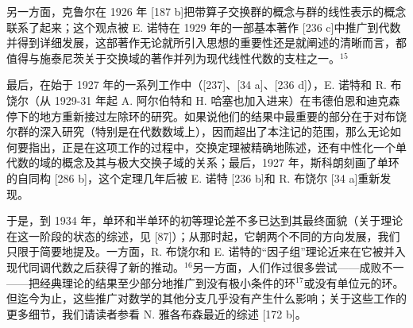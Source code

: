另一方面，克鲁尔在 1926 年 {[}187 b{]}把带算子交换群的概念与群的线性表示的概念联系了起来；这个观点被 E. 诺特在 1929 年的一部基本著作 {[}236 c{]}中推广到代数并得到详细发展，这部著作无论就所引入思想的重要性还是就阐述的清晰而言，都值得与施泰尼茨关于交换域的著作并列为现代线性代数的支柱之一。\(^{15}\)

最后，在始于 1927 年的一系列工作中（{[}237{]}、{[}34 a{]}、{[}236 d{]}），E. 诺特和 R. 布饶尔（从 1929-31 年起 A. 阿尔伯特和 H. 哈塞也加入进来）在韦德伯恩和迪克森停下的地方重新接过左除环的研究。如果说他们的结果中最重要的部分在于对布饶尔群的深入研究（特别是在代数数域上），因而超出了本注记的范围，那么无论如何要指出，正是在这项工作的过程中，交换定理被精确地陈述，还有中性化一个单代数的域的概念及其与极大交换子域的关系；最后，1927 年，斯科朗刻画了单环的自同构 {[}286 b{]}，这个定理几年后被 E. 诺特 {[}236 b{]}和 R. 布饶尔 {[}34 a{]}重新发现。

于是，到 1934 年，单环和半单环的初等理论差不多已达到其最终面貌（关于理论在这一阶段的状态的综述，见 {[}87{]}）；从那时起，它朝两个不同的方向发展，我们只限于简要地提及。一方面，R. 布饶尔和 E. 诺特的“因子组”理论近来在它被并入现代同调代数之后获得了新的推动。\(^{16}\)另一方面，人们作过很多尝试——成败不一——把经典理论的结果至少部分地推广到没有极小条件的环\(^{17}\)或没有单位元的环。但迄今为止，这些推广对数学的其他分支几乎没有产生什么影响；关于这些工作的更多细节，我们请读者参看 N. 雅各布森最近的综述 {[}172 b{]}。
